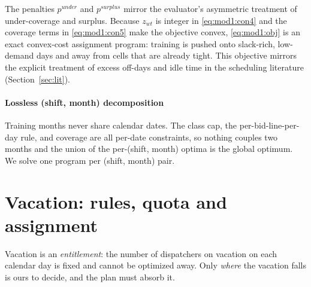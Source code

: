 \documentclass[preprint,12pt]{elsarticle}
\begin{document}
   The penalties $p^{under}$ and $p^{surplus}$ mirror the evaluator's asymmetric treatment of under-coverage and surplus. Because $z_{wt}$ is integer in \eqref{eq:mod1:con4} and the coverage terms in \eqref{eq:mod1:con5} make the objective convex, \eqref{eq:mod1:obj} is an exact convex-cost assignment program: training is pushed onto slack-rich, low-demand days and away from cells that are already tight. This objective mirrors the explicit treatment of excess off-days and idle time in the scheduling literature (Section~\ref{sec:lit}).

   \paragraph{Lossless (shift, month) decomposition} Training months never share calendar dates. The class cap, the per-bid-line-per-day rule, and coverage are all per-date constraints, so nothing couples two months and the union of the per-(shift, month) optima is the global optimum. We solve one program per (shift, month) pair.

\section{Vacation: rules, quota and assignment}
   Vacation is an \emph{entitlement}: the number of dispatchers on vacation on each calendar day is fixed and cannot be optimized away. Only \emph{where} the vacation falls is ours to decide, and the plan must absorb it.
\end{document}
